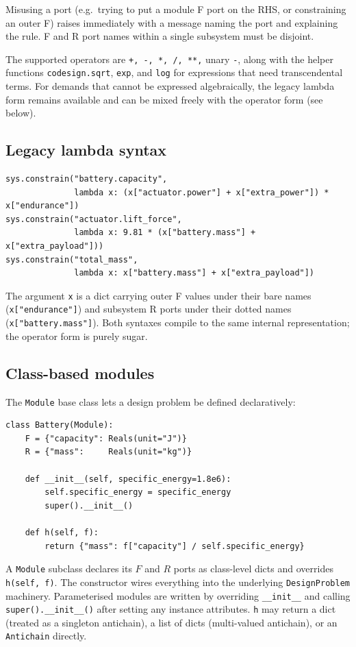 \documentclass[11pt,a4paper]{article}
\begin{document}
Misusing a port (e.g.\ trying to put a module F port on the RHS, or
constraining an outer F) raises immediately with a message naming the
port and explaining the rule. F and R port names within a single
subsystem must be disjoint.

The supported operators are \texttt{+, -, *, /, **,} unary \texttt{-},
along with the helper functions \texttt{codesign.sqrt}, \texttt{exp},
and \texttt{log} for expressions that need transcendental terms. For
demands that cannot be expressed algebraically, the legacy lambda form
remains available and can be mixed freely with the operator form (see
below).

\subsection{Legacy lambda syntax}

\begin{lstlisting}
sys.constrain("battery.capacity",
              lambda x: (x["actuator.power"] + x["extra_power"]) * x["endurance"])
sys.constrain("actuator.lift_force",
              lambda x: 9.81 * (x["battery.mass"] + x["extra_payload"]))
sys.constrain("total_mass",
              lambda x: x["battery.mass"] + x["extra_payload"])
\end{lstlisting}

The argument \texttt{x} is a dict carrying outer F values under their
bare names (\texttt{x["endurance"]}) and subsystem R ports under their
dotted names (\texttt{x["battery.mass"]}). Both syntaxes compile to the
same internal representation; the operator form is purely sugar.

\subsection{Class-based modules}

The \texttt{Module} base class lets a design problem be defined
declaratively:

\begin{lstlisting}
class Battery(Module):
    F = {"capacity": Reals(unit="J")}
    R = {"mass":     Reals(unit="kg")}

    def __init__(self, specific_energy=1.8e6):
        self.specific_energy = specific_energy
        super().__init__()

    def h(self, f):
        return {"mass": f["capacity"] / self.specific_energy}
\end{lstlisting}

A \texttt{Module} subclass declares its $F$ and $R$ ports as
class-level dicts and overrides \texttt{h(self, f)}. The constructor
wires everything into the underlying \texttt{DesignProblem} machinery.
Parameterised modules are written by overriding \texttt{\_\_init\_\_}
and calling \texttt{super().\_\_init\_\_()} after setting any
instance attributes. \texttt{h} may return a dict (treated as a
singleton antichain), a list of dicts (multi-valued antichain), or
an \texttt{Antichain} directly.
\end{document}
